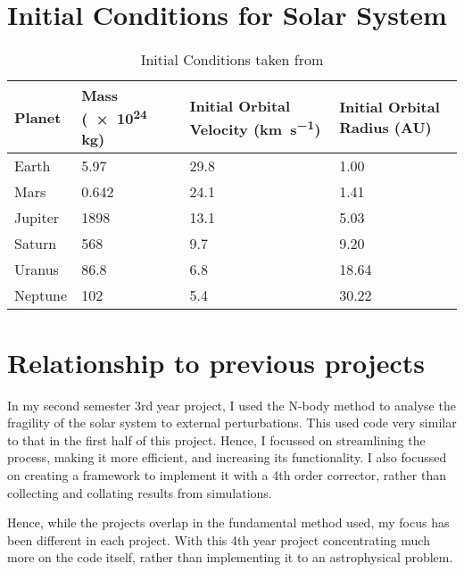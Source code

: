 \documentclass[a4paper,10pt]{article}
\begin{document}
\begin{appendix}

\section{Initial Conditions for Solar System}\label{cond}
\begin{table}[H]
\begin{tabular}{l|l|l|l}
Planet  & Mass (\num{e24} \si{\kilo\gram}) & Initial Orbital Velocity (\si{\kilo\metre\per\second}) & Initial Orbital Radius (AU) \\ \hline
Earth   & 5.97                                     & 29.8                                                & 1.00                        \\
Mars    & 0.642                                    & 24.1                                                & 1.41                        \\
Jupiter & 1898                                     & 13.1                                                & 5.03                        \\
Saturn  & 568                                      & 9.7                                                 & 9.20                        \\
Uranus  & 86.8                                     & 6.8                                                 & 18.64                       \\
Neptune & 102                                      & 5.4                                                 & 30.22                      
\end{tabular}
\caption{\label{InitConds}Initial Conditions taken from \cite{PlanetFacts}}
\end{table}

\section{Relationship to previous projects}
In my second semester 3rd year project, I used the N-body method to analyse the fragility of the solar system to external perturbations. This used code very similar to that in the first half of this project. Hence, I focussed on streamlining the process, making it more efficient, and increasing its functionality. I also focussed on creating a framework to implement it with a 4th order corrector, rather than collecting and collating results from simulations. 

Hence, while the projects overlap in the fundamental method used, my focus has been different in each project. With this 4th year project concentrating much more on the code itself, rather than implementing it to an astrophysical problem.

\end{appendix}
\end{document}
